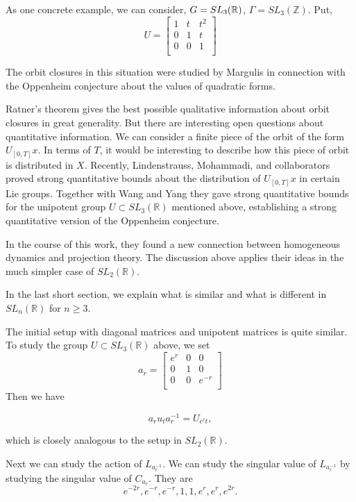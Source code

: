 \documentclass[12pt]{amsart}
\newcommand{\RR}{\mathbb{R}}
\newcommand{\Z}{\mathbb{Z}}
\begin{document}
As one concrete example,  we can consider, $G=SL_3(\mathbb{R})$, $\Gamma=SL_3(\Z)$. Put, $$U=\begin{bmatrix}
    1& t& t^2\\
    0& 1& t\\
    0& 0& 1\\
\end{bmatrix}$$

The orbit closures in this situation were studied by Margulis in connection with the Oppenheim conjecture about the values of quadratic forms. 

Ratner's theorem gives the best possible qualitative information about orbit closures in great generality.   But there are interesting open questions about quantitative information.   We can consider a finite piece of the orbit of the form $U_{[0,T]} x$.   In terms of $T$,  it would be interesting to describe how this piece of orbit is distributed in $X$.   Recently,  Lindenstrauss,  Mohammadi,  and collaborators proved strong quantitative bounds about the distribution of $U_{[0,T]} x$ in certain Lie groups.  Together with Wang and Yang they gave strong quantitative bounds for the unipotent group $U \subset SL_3(\RR)$ mentioned above,  establishing a strong quantitative version of the Oppenheim conjecture.  

In the course of this work,  they found a new connection between homogeneous dynamics and projection theory.   The discussion above applies their ideas in the much simpler case of $SL_2(\RR)$. 

In the last short section,  we explain what is similar and what is different in $SL_n(\RR)$ for $n \ge 3$.  

The initial setup with diagonal matrices and unipotent matrices is quite similar.  To study the group $U \subset SL_3(\RR)$ above,  we set
$$ a_r=\begin{bmatrix}
    e^r& 0& 0\\
    0& 1& 0\\
    0& 0& e^{-r}\\
\end{bmatrix}$$
Then we have


$$a_ru_ta_r^{-1}=U_{e^rt},$$

which is closely analogous to the setup in $SL_2(\RR)$.  

Next we can study the action of $L_{a_r^{-1}}$. We can study the singular value of $L_{a_r^{-1}}$ by studying the singular value of $C_{a_r}$. They are 
$$e^{-2r}, e^{-r},e^{-r},1,1,e^r,e^r,e^{2r}.$$
\end{document}
